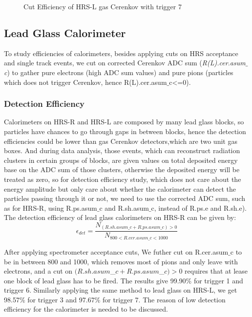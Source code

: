  \begin{figure}[htb]
 \centerline{}
 \caption[Cut Efficiency of HRS-L gas Cerenkov with trigger 7 ]{\footnotesize{Cut Efficiency of HRS-L gas Cerenkov with trigger 7}
 \label{cer_eff_t7}}
 \end{figure}


\clearpage

\subsection{Lead Glass Calorimeter}

 To study efficiencies of calorimeters, besides applying cuts on HRS acceptance and single track events, we cut on corrected Cerenkov ADC sum (\emph{R(L).cer.asum$\_$c}) to gather pure electrons (high ADC sum values) and pure pions (particles which does not trigger Cerenkov, hence R(L).cer.asum$\_$c<=0). 

\subsubsection{Detection Efficiency}

 Calorimeters on HRS-R and HRS-L are composed by many lead glass blocks, so particles have chances to go through gaps in between blocks, hence the detection efficiencies could be lower than gas Cerenkov detectors,which are two unit gas boxes. And during data analysis, those events, which can reconstruct radiation clusters in certain groups of blocks, are given values on total deposited energy base on the ADC sum of those clusters, otherwise the deposited energy will be treated as zero, so for detection efficiency study, which does not care about the energy amplitude but only care about whether the calorimeter can detect the particles passing through it or not, we need to use the corrected ADC sum, such as for HRS-R, using R.ps.asum$\_$c and R.sh.asum$\_$c, instead of R.ps.e and R.sh.e). The detection efficiency of lead glass calorimeters on HRS-R can be given by:
\begin{equation}
 \epsilon_{det} = \frac{N_{(R.sh.asum\_c+R.ps.asum\_c)>0}}{N_{800<R.cer.asum\_c<1000}}
\end{equation}

 After applying spectrometer acceptance cuts, We futher cut on R.cer.asum$\_$c to be in between 800 and 1000, which removes most of pions and only leave with electrons, and a cut on $(R.sh.asum$\_$c+R.ps.asum$\_$c)>0$ requires that at lease one block of lead glass has to be fired. The results give 99.90\% for trigger 1 and trigger 6. Similarly applying the same method to lead glass on HRS-L, we get 98.57\% for trigger 3 and 97.67\% for trigger 7. The reason of low detection efficiency for the calorimeter is needed to be discussed. 

